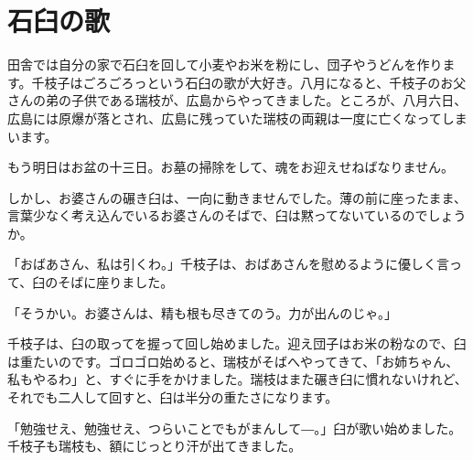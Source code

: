 \section{石臼の歌}
田舎では自分の家で石臼を回して小麦やお米を粉にし、団子やうどんを作ります。千枝子はごろごろっという石臼の歌が大好き。八月になると、千枝子のお父さんの弟の子供である瑞枝が、広島からやってきました。ところが、八月六日、広島には原爆が落とされ、広島に残っていた瑞枝の両親は一度に亡くなってしまいます。

もう明日はお盆の十三日。お墓の掃除をして、魂をお迎えせねばなりません。

しかし、お婆さんの碾き臼は、一向に動きませんでした。薄の前に座ったまま、言葉少なく考え込んでいるお婆さんのそばで、臼は黙ってないているのでしょうか。

「おばあさん、私は引くわ。」千枝子は、おばあさんを慰めるように優しく言って、臼のそばに座りました。

「そうかい。お婆さんは、精も根も尽きてのう。力が出んのじゃ。」

千枝子は、臼の取ってを握って回し始めました。迎え団子はお米の粉なので、臼は重たいのです。ゴロゴロ始めると、瑞枝がそばへやってきて、「お姉ちゃん、私もやるわ」と、すぐに手をかけました。瑞枝はまた碾き臼に慣れないけれど、それでも二人して回すと、臼は半分の重たさになります。

「勉強せえ、勉強せえ、つらいことでもがまんして―。」臼が歌い始めました。千枝子も瑞枝も、額にじっとり汗が出てきました。